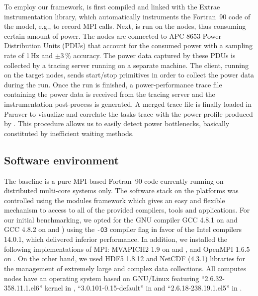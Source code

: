To employ our  framework, \cosmoart is first compiled  and linked with
the  Extrae instrumentation  library, which  automatically instruments
the Fortran~90  code of the model,  e.g., to record  MPI calls.  Next,
\cosmoart  is run  on the  nodes, thus  consuming certain  amount of
power. The  nodes are connected  to APC 8653 Power  Distribution Units
(PDUs) that account  for the consumed   power with  a sampling rate of
1\,Hz and $\pm3\,\%$ accuracy. The power data captured by  these PDUs is collected by a \pmlib
tracing server running  on a separate machine. The  client, running on
the target nodes, sends start/stop  primitives in order to collect the
power  data during  the \cosmoart  run. Once  the run  is  finished, a
power-performance  trace file  containing the  power data  is received
from  the  tracing  server  and the  instrumentation  post-process  is
generated.  A  merged trace  file  is  finally  loaded in  Paraver  to
visualize  and correlate  the  tasks trace with the  power
profile  produced by \cosmoart.  This procedure  allows us  to easily
detect power bottlenecks, basically constituted by inefficient waiting
methods.

\subsection{Software environment}
\label{subsec:3.2}

The \cosmoart  baseline is a pure MPI-based  Fortran~90 code currently
running on distributed multi-core systems only.  The software stack on
the platforms  was controlled using the modules  framework which gives
an  easy and  flexible  mechanism to  access  to all  of the  provided
compilers, tools  and applications.  For our  initial benchmarking, we
opted for the GNU compiler GCC 4.8.1 on \monch and GCC 4.8.2 on \pilat
and  \tinto)  using  the \texttt{-O3}  compiler  flag  in  favor of  the  Intel
compilers 14.0.1, which  delivered inferior performance.  In addition,
we  installed the following  implementations of  MPI: MVAPICH2  1.9 on
\monch and \pilat, and OpenMPI 1.6.5  on \tinto. On the other hand, we
used HDF5  1.8.12 and NetCDF  (4.3.1) libraries for the  management of
extremely large and complex data collections.  All computes nodes have
an     operating    system     based     on    GNU/Linux     featuring
``2.6.32-358.11.1.el6'' kernel  in \monch, ``3.0.101-0.15-default'' in
\pilat and ``2.6.18-238.19.1.el5'' in \tinto.

